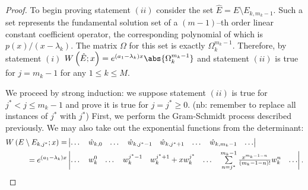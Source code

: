 \documentclass{article}
\begin{document}
\begin{proof}
To begin proving statement $(ii)$ consider the set $\hat{E} = E \setminus E_{k,m_k-1}$.
Such a set represents the fundamental solution set of a $(m-1)$--th order linear constant coefficient operator, the corresponding polynomial of which is $p(x) / (x - \lambda_k)$.
The matrix $\Omega$ for this set is exactly $\Omega_k^{m_k-1}$.
Therefore, by statement $(i)$ $\W{\hat{E}}{x} = e^{(a_1 - \lambda_k)x} \abs{\Omega_k^{m_k-1}}$ and statement $(ii)$ is true for $j = m_k-1$ for any $1 \leq k \leq M$.

We proceed by strong induction: we suppose statement $(ii)$ is true for $j^* < j \leq m_k-1$ and prove it is true for $j = j^* \geq 0$. (nb: remember to replace all instances of $j^*$ with $j^*$)
First, we perform the Gram-Schmidt process described previously.
We may also take out the exponential functions from the determinant:
\begin{equation*}
\begin{split}
W \left ( E \setminus E_{k,j^*} ; x \right ) = & \begin{vmatrix} \dots & \hat{w}_{k,0} & \dots & \hat{w}_{k,j^*-1} & \hat{w}_{k,j^*+1} & \dots & \hat{w}_{k,m_k-1} & \dots \end{vmatrix} \\
 = e^{(a_1 - \lambda_k)x}	  & \begin{vmatrix} \dots & w_k^0 & \dots & w_k^{j^*-1} & w_k^{j^*+1} + x w_k^{j^*} & \dots & \sum\limits_{n=j^*}^{m_k-1} \frac{x^{m_k-1-n}}{(m_k-1-n)!} w_k^n & \dots \end{vmatrix} .
\end{split}
\end{equation*}


\end{proof}
\end{document}
